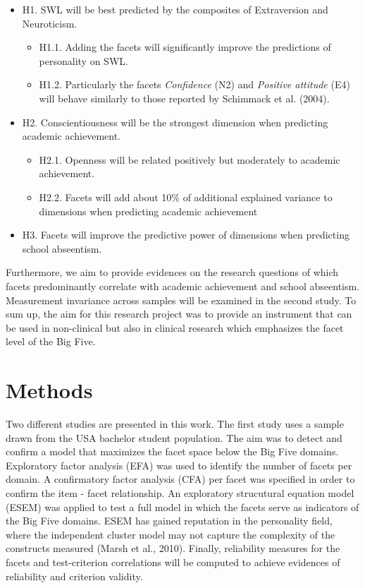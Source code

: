 \documentclass[,man,floatsintext]{apa6}
\providecommand{\tightlist}{%
  \setlength{\itemsep}{0pt}\setlength{\parskip}{0pt}}
\begin{document}
\begin{itemize}
\tightlist
\item
  H1. SWL will be best predicted by the composites of Extraversion and
  Neuroticism.

  \begin{itemize}
  \tightlist
  \item
    H1.1. Adding the facets will significantly improve the predictions
    of personality on SWL.
  \item
    H1.2. Particularly the facets \emph{Confidence} (N2) and
    \emph{Positive attitude} (E4) will behave similarly to those
    reported by Schimmack et al. (2004).
  \end{itemize}
\item
  H2. Conscientiousness will be the strongest dimension when predicting
  academic achievement.

  \begin{itemize}
  \tightlist
  \item
    H2.1. Openness will be related positively but moderately to academic
    achievement.
  \item
    H2.2. Facets will add about 10\% of additional explained variance to
    dimensions when predicting academic achievement
  \end{itemize}
\item
  H3. Facets will improve the predictive power of dimensions when
  predicting school abseentism.
\end{itemize}

Furthermore, we aim to provide evidences on the research questions of
which facets predominantly correlate with academic achievement and
school abseentism. Measurement invariance across samples will be
examined in the second study. To sum up, the aim for this research
project was to provide an instrument that can be used in non-clinical
but also in clinical research which emphasizes the facet level of the
Big Five.

\section{Methods}\label{methods}

Two different studies are presented in this work. The first study uses a
sample drawn from the USA bachelor student population. The aim was to
detect and confirm a model that maximizes the facet space below the Big
Five domains. Exploratory factor analysis (EFA) was used to identify the
number of facets per domain. A confirmatory factor analysis (CFA) per
facet was specified in order to confirm the item - facet relationship.
An exploratory strucutural equation model (ESEM) was applied to test a
full model in which the facets serve as indicators of the Big Five
domains. ESEM has gained reputation in the personality field, where the
independent cluster model may not capture the complexity of the
constructs measured (Marsh et al., 2010). Finally, reliability measures
for the facets and test-criterion correlations will be computed to
achieve evidences of reliability and criterion validity.
\end{document}

